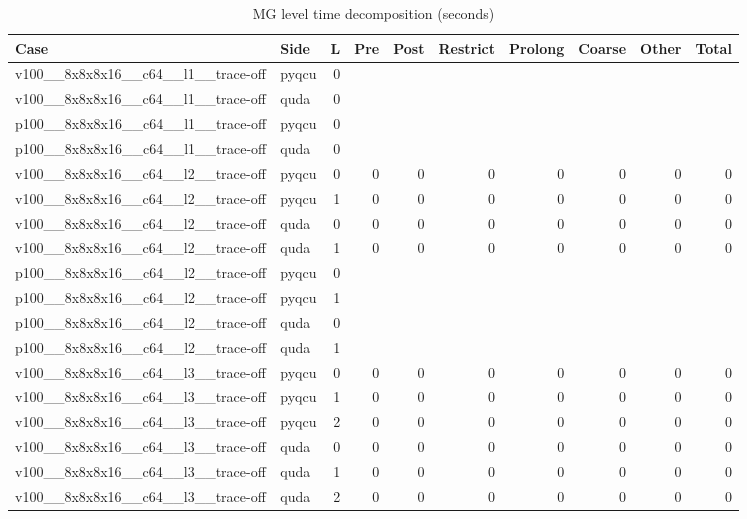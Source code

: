 
\begin{table}[htbp]
\centering
\caption{MG level time decomposition (seconds)}
\small
\begin{tabular}{@{}llrrrrrrrr@{}}
\toprule
Case & Side & L & Pre & Post & Restrict & Prolong & Coarse & Other & Total \\
\midrule
v100\_\_8x8x8x16\_\_c64\_\_l1\_\_trace-off & pyqcu & 0 &  &  &  &  &  &  &  \\
v100\_\_8x8x8x16\_\_c64\_\_l1\_\_trace-off & quda & 0 &  &  &  &  &  &  &  \\
p100\_\_8x8x8x16\_\_c64\_\_l1\_\_trace-off & pyqcu & 0 &  &  &  &  &  &  &  \\
p100\_\_8x8x8x16\_\_c64\_\_l1\_\_trace-off & quda & 0 &  &  &  &  &  &  &  \\
v100\_\_8x8x8x16\_\_c64\_\_l2\_\_trace-off & pyqcu & 0 & 0 & 0 & 0 & 0 & 0 & 0 & 0 \\
v100\_\_8x8x8x16\_\_c64\_\_l2\_\_trace-off & pyqcu & 1 & 0 & 0 & 0 & 0 & 0 & 0 & 0 \\
v100\_\_8x8x8x16\_\_c64\_\_l2\_\_trace-off & quda & 0 & 0 & 0 & 0 & 0 & 0 & 0 & 0 \\
v100\_\_8x8x8x16\_\_c64\_\_l2\_\_trace-off & quda & 1 & 0 & 0 & 0 & 0 & 0 & 0 & 0 \\
p100\_\_8x8x8x16\_\_c64\_\_l2\_\_trace-off & pyqcu & 0 &  &  &  &  &  &  &  \\
p100\_\_8x8x8x16\_\_c64\_\_l2\_\_trace-off & pyqcu & 1 &  &  &  &  &  &  &  \\
p100\_\_8x8x8x16\_\_c64\_\_l2\_\_trace-off & quda & 0 &  &  &  &  &  &  &  \\
p100\_\_8x8x8x16\_\_c64\_\_l2\_\_trace-off & quda & 1 &  &  &  &  &  &  &  \\
v100\_\_8x8x8x16\_\_c64\_\_l3\_\_trace-off & pyqcu & 0 & 0 & 0 & 0 & 0 & 0 & 0 & 0 \\
v100\_\_8x8x8x16\_\_c64\_\_l3\_\_trace-off & pyqcu & 1 & 0 & 0 & 0 & 0 & 0 & 0 & 0 \\
v100\_\_8x8x8x16\_\_c64\_\_l3\_\_trace-off & pyqcu & 2 & 0 & 0 & 0 & 0 & 0 & 0 & 0 \\
v100\_\_8x8x8x16\_\_c64\_\_l3\_\_trace-off & quda & 0 & 0 & 0 & 0 & 0 & 0 & 0 & 0 \\
v100\_\_8x8x8x16\_\_c64\_\_l3\_\_trace-off & quda & 1 & 0 & 0 & 0 & 0 & 0 & 0 & 0 \\
v100\_\_8x8x8x16\_\_c64\_\_l3\_\_trace-off & quda & 2 & 0 & 0 & 0 & 0 & 0 & 0 & 0 \\

\end{tabular}
\end{table}
